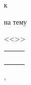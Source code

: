 \begin{center}
\begin{center}
\vspace{0.35cm}

к\xspace\doctypeb

\vspace{0.4cm}



{\smaller[1]
на тему

<<\Title>>}
\end{center}

\vspace{3.0cm}

\large

\begin{tabular}{p{}P{0.25\textwidth}P{0.25\textwidth}} 
 \\[10pt]
 \\[10pt]
 \\[10pt]
 \\[10pt]
 \\
\end{tabular}

\vspace{4.5cm}

\City, \Year

\end{center}




